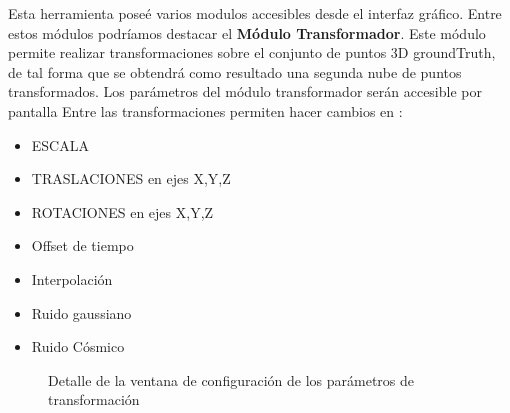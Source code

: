 Esta herramienta poseé varios modulos accesibles desde el interfaz gráfico. Entre estos módulos podríamos destacar el \textbf{Módulo Transformador}.
Este módulo permite realizar transformaciones sobre el conjunto de puntos 3D groundTruth, de tal forma que se obtendrá como resultado una segunda nube de puntos transformados.
Los parámetros del módulo transformador serán accesible por pantalla
Entre las transformaciones permiten hacer cambios en :
\begin{itemize}
\item ESCALA
\item TRASLACIONES en ejes X,Y,Z
\item ROTACIONES en ejes X,Y,Z
\item Offset de tiempo
\item Interpolación
\item Ruido gaussiano
\item Ruido Cósmico
\end{itemize}

\begin{figure}[H]
\begin{center}
\hspace{0.5cm}
\end{center}
\caption{Detalle de la ventana de configuración de los parámetros de transformación }
\end{figure}


